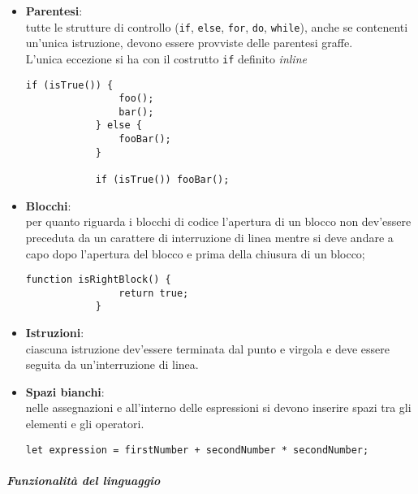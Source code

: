 \begin{itemize}
	\item \textbf{Parentesi}:\\
		tutte le strutture di controllo (\texttt{if}, \texttt{else}, \texttt{for}, \texttt{do}, \texttt{while}), anche se contenenti
		un'unica istruzione, devono essere provviste delle parentesi graffe.\\

		L'unica eccezione si ha con il costrutto \texttt{if} definito \emph{inline}\\

		\begin{lstlisting}[style=htmlcssjs]
			if (isTrue()) {
				foo();
				bar();
			} else {
				fooBar();
			}

			if (isTrue()) fooBar();
		\end{lstlisting}

	\item \textbf{Blocchi}:\\
		per quanto riguarda i blocchi di codice l'apertura di un blocco non dev'essere preceduta da un carattere di interruzione di linea
		mentre si deve andare a capo dopo l'apertura del blocco e prima della chiusura di un blocco;
		\begin{lstlisting}[style=htmlcssjs]
			function isRightBlock() {
				return true;
			}
		\end{lstlisting}

	\item \textbf{Istruzioni}:\\
		ciascuna istruzione dev'essere terminata dal punto e virgola e deve essere seguita da un'interruzione di linea.

	\item \textbf{Spazi bianchi}:\\
		nelle assegnazioni e all'interno delle espressioni si devono inserire spazi tra gli elementi e gli operatori.
		\begin{lstlisting}[style=htmlcssjs]
			let expression = firstNumber + secondNumber * secondNumber;
		\end{lstlisting}
\end{itemize}

\subparagraph{Funzionalità del linguaggio}

